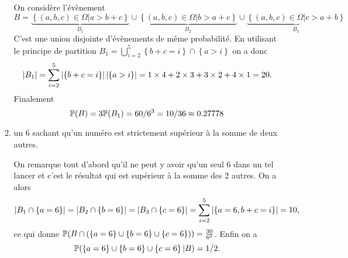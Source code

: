 \documentclass[a4paper]{tp_um}
\begin{document}
\begin{enumerate}
\begin{enumerate}
                \bigskip
                On considère l'évènement 
                \[
                    B  = \underbrace{\left\{ (a,b,c) \in \Omega | a> b+c \right\}}_{B_1} \cup  \underbrace{\left\{ (a,b,c) \in \Omega | b> a+c \right\} }_{B_2} \cup  \underbrace{\left\{ (a,b,c) \in \Omega | c> a+b \right\}}_{B_3}
                \]
                C'est une union disjointe d'évènements de même probabilité. En utilisant le principe de partition $B_1 = \bigcup_{i=2}^5 \left\{ b+c = i\right\} \cap \left\{ a > i \right\}$ on a donc
                \[ 
                    |B_1| =  \sum_{i=2}^5 \abs{\left\{ b+c = i\right\}}\abs{\left\{ a > i \right\}} =  1 \times 4 +  2 \times 3 + 3 \times 2 + 4 \times 1= 20.
                \] 
                Finalement 
                \[
                    \P(B) = 3 \P(B_1) = 60 / 6^3 = 10 /36 \approx 0.27778
                \]

                \bigskip
            \item un $6$ sachant qu'un numéro est strictement supérieur à la somme de deux autres.

                \bigskip
                On remarque tout d'abord qu'il ne peut y avoir qu'un seul 6 dans un tel lancer et c'est le résultat qui est supérieur à la somme des 2 autres. On a alors
                \[
                    \abs{B_1 \cap \left\{ a=6 \right\}} = \abs{B_2 \cap \left\{ b=6 \right\}}  =  \abs{B_3 \cap \left\{ c=6 \right\}}  =  \sum_{i=2}^5 \abs{\left\{a=6, b+c = i\right\}}=10,
                \]
                ce qui donne $\P(B \cap ( \left\{ a=6 \right\} \cup \left\{ b=6 \right\} \cup \left\{ c=6 \right\})) = \frac{30}{6^3}$. Enfin on a\[
                \P( \left\{ a=6 \right\} \cup \left\{ b=6 \right\} \cup \left\{ c=6 \right\} | B ) = 1/2.\]

                \bigskip
        \end{enumerate}
\end{enumerate}
\end{document}
